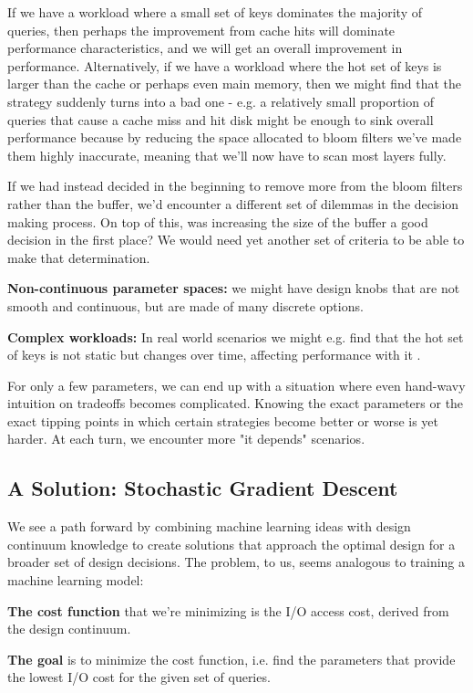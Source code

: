 \documentclass{cidr-2019}
\begin{document}
If we have a workload where a small set of keys dominates the majority of
queries, then perhaps the improvement from cache hits will dominate performance
characteristics, and we will get an overall improvement in performance.
Alternatively, if we have a workload where the hot set of keys is larger than
the cache or perhaps even main memory, then we might find that the strategy
suddenly turns into a bad one - e.g. a relatively small proportion of queries
that cause a cache miss and hit disk might be enough to sink overall
performance because by reducing the space allocated to bloom filters we've made
them highly inaccurate, meaning that we'll now have to scan most layers fully. 

If we had instead decided in the beginning to remove more from the bloom
filters rather than the buffer, we'd encounter a different set of dilemmas in
the decision making process. On top of this, was increasing the size of the
buffer a good decision in the first place? We would need yet another set of
criteria to be able to make that determination.

\textbf{Non-continuous parameter spaces:} we might have design knobs that are
not smooth and continuous, but are made of many discrete options.

\textbf{Complex workloads:} In real world scenarios we might e.g. find that the
hot set of keys is not static but changes over time, affecting performance with
it \cite{characterizing-memcached}.

For only a few parameters, we can end up with a situation where even hand-wavy
intuition on tradeoffs becomes complicated. Knowing the exact parameters or the
exact tipping points in which certain strategies become better or worse is yet
harder. At each turn, we encounter more "it depends" scenarios.

\subsection{A Solution: Stochastic Gradient Descent}

We see a path forward by combining machine learning ideas with design continuum
knowledge to create solutions that approach the optimal design for a broader
set of design decisions. The problem, to us, seems analogous to training a
machine learning model:

\textbf{The cost function} that we're minimizing is the I/O access cost,
derived from the design continuum.

\textbf{The goal} is to minimize the cost function, i.e. find the parameters
that provide the lowest I/O cost for the given set of queries.
\end{document}
